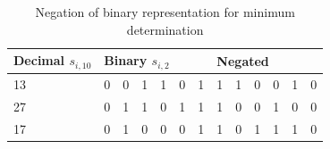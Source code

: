 		\begin{table}[!htb]
			\centering
			\caption{Negation of binary representation for minimum determination}
			\label{table:secure minimum negation}
			\begin{tabular}{|l|l|l|l|l|l|l|l|l|l|l|l|l|}
				\hline
				Decimal $s_{i,10}$ & \multicolumn{6}{l|}{Binary $s_{i,2}$}  & \multicolumn{6}{l|}{Negated} \\ \hline
				13                 & 0    & 0    & 1    & 1    & 0   & 1 & 1    & 1    & 0    & 0    & 1   & 0   \\ \hline
				27                 & 0    & 1    & 1    & 0    & 1   & 1 & 1    & 0    & 0    & 1    & 0   & 0   \\ \hline
				17                 & 0    & 1    & 0    & 0    & 0   & 1 & 1    & 0    & 1    & 1    & 1   & 0   \\ \hline
			\end{tabular}
		\end{table}

